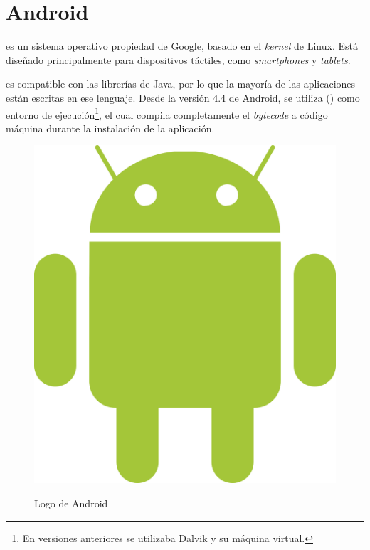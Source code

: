 
 \section{Android}

  es un sistema operativo propiedad de Google, basado en el \emph{kernel} de Linux. Está diseñado principalmente para dispositivos táctiles, como \emph{smartphones} y \emph{tablets}.

  es compatible con las librerías de Java, por lo que la mayoría de las aplicaciones están escritas en ese lenguaje.
 Desde la versión 4.4 de Android, se utiliza  () como entorno de ejecución\footnote{En versiones anteriores se utilizaba Dalvik y su máquina virtual.},
 el cual compila completamente el \emph{bytecode} a código máquina durante la instalación de la aplicación. \emph{\parencite{Reference7}}

 \begin{figure}[ht]
   \centering
   \includegraphics[scale=0.05]{Figures/AndroidLogo}
   \decoRule
   \caption[Android (Logo)]{Logo de Android} \emph{\parencite{Reference7}}
   \label{fig:AndroidLogo}
 \end{figure}

